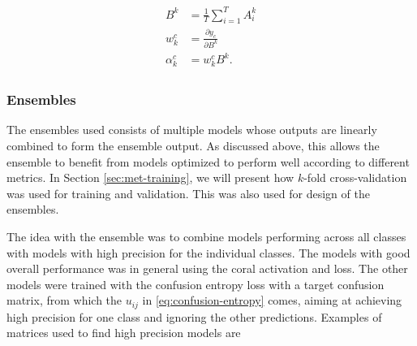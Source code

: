  \begin{align}
   \begin{split}
      B^k &= \frac{1}{T}\sum_{i=1}^T A_i^k \\
      w_k^c &= \frac{\partial y_c}{\partial B^k} \\
      \alpha_k^c &= w_k^c B^k.
      \label{eq:input-importance}
   \end{split}
 \end{align}


\subsubsection{Ensembles} \label{sec:met-ensembles}
The ensembles used consists of multiple models whose outputs are linearly combined to form the ensemble output. As discussed above, this allows the ensemble to benefit from models optimized to perform well according to different metrics. In Section \ref{sec:met-training}, we will present how $k$-fold cross-validation was used for training and validation. This was also used for design of the ensembles.

The idea with the ensemble was to combine models performing across all classes with models with high precision for the individual classes. The models with good overall performance was in general using the \gls{coral} activation and loss. The other models were trained with the confusion entropy loss with a target confusion matrix, from which the $u_{ij}$ in \eqref{eq:confusion-entropy} comes, aiming at achieving high precision for one class and ignoring the other predictions. Examples of matrices used to find high precision models are

